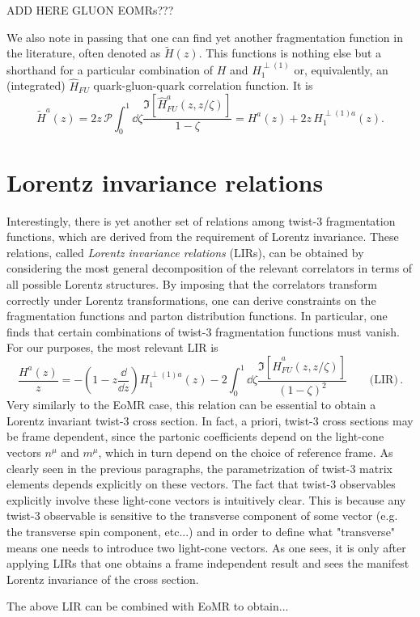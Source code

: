 \noindent ADD HERE GLUON EOMRs???

\noindent We also note in passing that one can find yet another fragmentation function in the literature, often denoted as $\tilde H(z)$. This functions is nothing else but a shorthand for a particular combination of $H$ and $H_1^{\perp(1)}$ or, equivalently, an (integrated) $\hat H_{FU}$ quark-gluon-quark correlation function. It is
\begin{equation}\label{eq:Htildedefinition}
    \tilde{H}^a(z)=2z\,\mathcal{P}\int_0^1\dd \zeta\frac{\Im[\hat H^a_{FU}(z,z/\zeta)]}{1-\zeta}=H^a(z)+2z\,H_1^{\perp(1)a}(z).
\end{equation}
\section{Lorentz invariance relations}
Interestingly, there is yet another set of relations among twist-3 fragmentation functions, which are derived from the requirement of Lorentz invariance. These relations, called \textit{Lorentz invariance relations} (LIRs), can be obtained by considering the most general decomposition of the relevant correlators in terms of all possible Lorentz structures. By imposing that the correlators transform correctly under Lorentz transformations, one can derive constraints on the fragmentation functions and parton distribution functions. In particular, one finds that certain combinations of twist-3 fragmentation functions must vanish. For our purposes, the most relevant LIR is \cite{kanazawa_operator_2016}
\begin{equation}
    \frac{H^a(z)}{z}=-\left(1-z\frac{\dd}{\dd z}\right)H_1^{\perp(1)a}(z)-2\int_0^1 \dd \zeta\frac{\Im[\hat H^a_{FU}(z,z/\zeta)]}{\left(1-\zeta\right)^2}\qquad \text{(LIR)}\,.
\end{equation}
Very similarly to the EoMR case, this relation can be essential to obtain a Lorentz invariant twist-3 cross section. In fact, a priori, twist-3 cross sections may be frame dependent, since the partonic coefficients depend on the light-cone vectors $n^\mu$ and $m^\mu$, which in turn depend on the choice of reference frame. As clearly seen in the previous paragraphs, the parametrization of twist-3 matrix elements depends explicitly on these vectors. The fact that twist-3 observables explicitly involve these light-cone vectors is intuitively clear. This is because any twist-3 observable is sensitive to the transverse component of some vector (e.g. the transverse spin component, etc...) and in order to define what "transverse" means one needs to introduce two light-cone vectors. As one sees, it is only after applying LIRs that one obtains a frame independent result and sees the manifest Lorentz invariance of the cross section. 

The above LIR can be combined with EoMR to obtain...